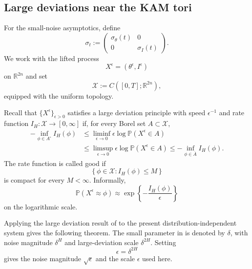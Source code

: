\documentclass[preprint,12pt]{elsarticle}
\theoremstyle{definition}
\theoremstyle{plain}
\begin{document}
\subsection{Large deviations near the KAM tori}

For the small-noise asymptotics, define
\begin{equation*}
    \sigma_t
    :=
    \begin{pmatrix}
        \sigma_\theta(t) & 0
        \\
        0 & \sigma_I(t)
    \end{pmatrix}.
\end{equation*}
We work with the lifted process
\begin{equation*}
    X^\epsilon
    =
    (\theta^\epsilon,I^\epsilon)
\end{equation*}
on $\mathbb R^{2n}$ and set
\begin{equation*}
    \mathcal X
    :=
    C([0,T];\mathbb R^{2n}),
\end{equation*}
equipped with the uniform topology.

Recall that $\{X^\epsilon\}_{\epsilon>0}$ satisfies a large deviation
principle with speed $\epsilon^{-1}$ and rate function
$I_H:\mathcal X\to[0,\infty]$ if, for every Borel set
$A\subset\mathcal X$,
\begin{equation}
\label{eq:LDP-definition-Hamiltonian}
\begin{aligned}
    -\inf_{\phi\in A^\circ}I_H(\phi)
    &\leq
    \liminf_{\epsilon\to0}
    \epsilon\log\mathbb P(X^\epsilon\in A)
    \\
    &\leq
    \limsup_{\epsilon\to0}
    \epsilon\log\mathbb P(X^\epsilon\in A)
    \leq
    -\inf_{\phi\in\overline A}I_H(\phi).
\end{aligned}
\end{equation}
The rate function is called good if
\begin{equation*}
    \left\{
        \phi\in\mathcal X:
        I_H(\phi)\leq M
    \right\}
\end{equation*}
is compact for every $M<\infty$. Informally,
\begin{equation*}
    \mathbb P(X^\epsilon\approx\phi)
    \approx
    \exp\left\{
        -\frac{I_H(\phi)}{\epsilon}
    \right\}
\end{equation*}
on the logarithmic scale.

Applying the large deviation result of \cite{FanYuYuan2023} to the
present distribution-independent system gives the following theorem.
The small parameter in \cite{FanYuYuan2023} is denoted by $\delta$,
with noise magnitude $\delta^H$ and large-deviation scale
$\delta^{2H}$. Setting
\begin{equation*}
    \epsilon=\delta^{2H}
\end{equation*}
gives the noise magnitude $\sqrt{\epsilon}$ and the scale $\epsilon$
used here.
\end{document}
